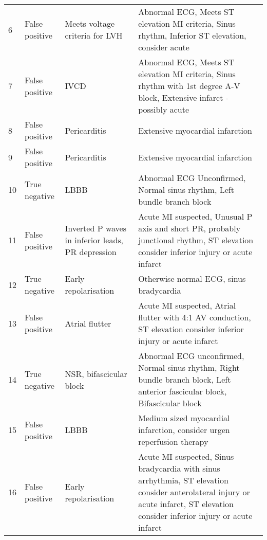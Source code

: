 \begin{longtable}[c]{Lp{0.18\textwidth}AA}
6&False positive&Meets voltage criteria for LVH&Abnormal ECG, \newline  Meets ST elevation MI criteria, \newline  Sinus rhythm, \newline  Inferior ST elevation, \newline  consider acute \\
7&False positive&IVCD&Abnormal ECG,  \newline  Meets ST elevation MI criteria,  \newline  Sinus rhythm with 1st degree A-V block,  \newline  Extensive infarct - possibly acute \\
8&False positive&Pericarditis&Extensive myocardial infarction \\
9&False positive&Pericarditis&Extensive myocardial infarction \\
10&True negative&LBBB&Abnormal ECG Unconfirmed,  \newline  Normal sinus rhythm,  \newline  Left bundle branch block \\
11&False positive&Inverted P waves in inferior leads,  \newline  PR depression&Acute MI suspected,  \newline  Unusual P axis and short PR,  \newline  probably junctional rhythm, \newline ST elevation consider inferior injury or acute infarct \\
12&True negative&Early repolarisation&Otherwise normal ECG, sinus bradycardia \\
13&False positive&Atrial flutter&Acute MI suspected,  \newline  Atrial flutter with 4:1 AV conduction, \newline  ST elevation consider inferior injury or acute infarct \\
14&True negative&NSR, bifascicular block&Abnormal ECG unconfirmed,  \newline  Normal sinus rhythm, Right bundle branch block,  \newline  Left anterior fascicular block, Bifascicular block \\
15&False positive&LBBB&Medium sized myocardial infarction,  \newline  consider urgen reperfusion therapy \\
16&False positive&Early repolarisation&Acute MI suspected,  \newline  Sinus bradycardia with sinus arrhythmia,  \newline  ST elevation consider anterolateral injury or acute infarct,  \newline  ST elevation consider inferior injury or acute infarct \\

\end{longtable}
